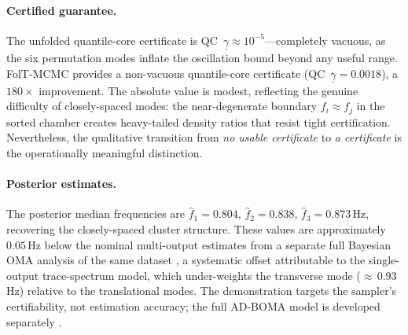 \paragraph{Certified guarantee.}
The unfolded quantile-core certificate is
QC~$\underline{\gamma} \approx 10^{-5}$---completely vacuous, as
the six permutation modes inflate the oscillation bound beyond
any useful range.  FolT-MCMC provides a non-vacuous quantile-core certificate
(QC~$\underline{\gamma} = 0.0018$), a $180\times$
improvement.  The absolute value is modest, reflecting the genuine
difficulty of closely-spaced modes: the near-degenerate boundary
$f_i \approx f_j$ in the sorted chamber creates heavy-tailed
density ratios that resist tight certification.  Nevertheless, the
qualitative transition from \emph{no usable certificate} to
\emph{a certificate} is the operationally meaningful distinction.

\paragraph{Posterior estimates.}
The posterior median frequencies are
$\hat{f}_1 = 0.804$, $\hat{f}_2 = 0.838$, $\hat{f}_3 = 0.873$\,Hz,
recovering the closely-spaced cluster structure.  These values are
approximately $0.05$\,Hz below the nominal multi-output estimates
from a separate full Bayesian OMA analysis of the same dataset
\citep{SATMCMCpaper}, a systematic offset attributable to the
single-output trace-spectrum model, which under-weights the
transverse mode (${\approx}\,0.93$\,Hz) relative to the
translational modes.  The demonstration targets the sampler's
certifiability, not estimation accuracy;
the full AD-BOMA model is developed separately
\citep{SATMCMCpaper}.
